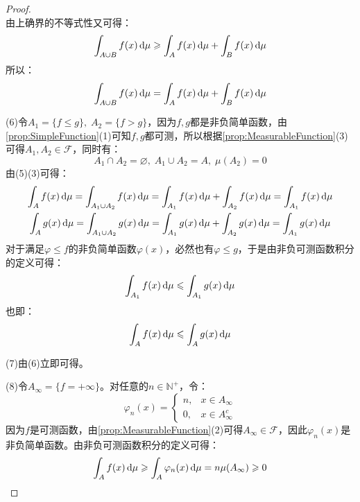 \begin{proof}
\begin{equation*}
	\end{equation*}
	由上确界的不等式性又可得：
	\begin{equation*}
		\int_{A\cup B}f(x)\mathop{}\!\mathrm{d}\mu\geqslant\int_{A}f(x)\mathop{}\!\mathrm{d}\mu+\int_{B}f(x)\mathop{}\!\mathrm{d}\mu
	\end{equation*}
	所以：
	\begin{equation*}
		\int_{A\cup B}f(x)\mathop{}\!\mathrm{d}\mu=\int_{A}f(x)\mathop{}\!\mathrm{d}\mu+\int_{B}f(x)\mathop{}\!\mathrm{d}\mu
	\end{equation*}\par
	(6)令$A_1=\{f\leqslant g\},\;A_2=\{f>g\}$，因为$f,g$都是非负简单函数，由\cref{prop:SimpleFunction}(1)可知$f,g$都可测，所以根据\cref{prop:MeasurableFunction}(3)可得$A_1,A_2\in \mathscr{F}$，同时有：
	\begin{equation*}
		A_1\cap A_2=\varnothing,\;A_1\cup A_2=A,\;\mu(A_2)=0
	\end{equation*}
	由(5)(3)可得：
	\begin{gather*}
		\int_{A}f(x)\dif\mu=\int_{A_1\cup A_2}f(x)\dif\mu=\int_{A_1}f(x)\dif\mu+\int_{A_2}f(x)\dif\mu=\int_{A_1}f(x)\dif\mu \\
		\int_{A}g(x)\dif\mu=\int_{A_1\cup A_2}g(x)\dif\mu=\int_{A_1}g(x)\dif\mu+\int_{A_2}g(x)\dif\mu=\int_{A_1}g(x)\dif\mu
	\end{gather*}
	对于满足$\varphi\leqslant f$的非负简单函数$\varphi(x)$，必然也有$\varphi\leqslant g$，于是由非负可测函数积分的定义可得：
	\begin{equation*}
		\int_{A_1}f(x)\mathop{}\!\mathrm{d}\mu\leqslant\int_{A_1}g(x)\mathop{}\!\mathrm{d}\mu
	\end{equation*}
	也即：
	\begin{equation*}
		\int_{A}f(x)\mathop{}\!\mathrm{d}\mu\leqslant\int_{A}g(x)\mathop{}\!\mathrm{d}\mu
	\end{equation*}\par
	(7)由(6)立即可得。\par
	(8)令$A_\infty=\{f=+\infty\}$。对任意的$n\in\mathbb{N}^+$，令：
	\begin{equation*}
		\varphi_n(x)=
		\begin{cases}
			n,&x\in A_\infty \\
			0,&x\in A_\infty^c
		\end{cases}
	\end{equation*}
	因为$f$是可测函数，由\cref{prop:MeasurableFunction}(2)可得$A_\infty\in\mathscr{F}$，因此$\varphi_n(x)$是非负简单函数。由非负可测函数积分的定义可得：
	\begin{equation*}
		\int_{A}f(x)\mathop{}\!\mathrm{d}\mu\geqslant\int_{A}\varphi_n(x)\mathop{}\!\mathrm{d}\mu=n\mu(A_\infty)\geqslant0
	\end{equation*}

\end{proof}
